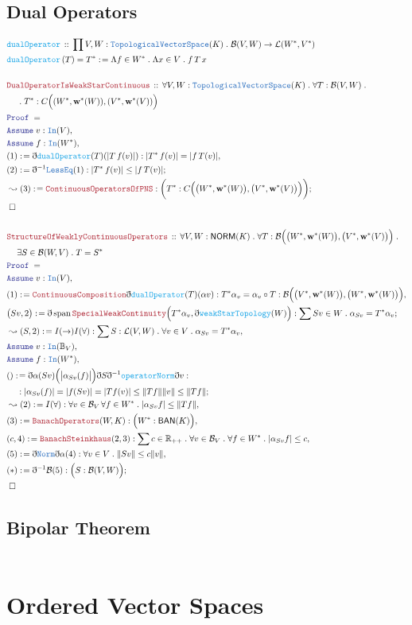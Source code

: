 \documentclass[12pt]{scrartcl}
\newcommand{\TYPE}[1]{\textcolor{NavyBlue}{\mathtt{#1}}}
\newcommand{\FUNC}[1]{\textcolor{Cerulean}{\mathtt{#1}}}
\newcommand{\LOGIC}[1]{\textcolor{Blue}{\mathtt{#1}}}
\newcommand{\THM}[1]{\textcolor{Maroon}{\mathtt{#1}}}
\renewcommand{\.}{\; . \;}
\newcommand{\de}{: \kern 0.1pc =}
\newcommand{\Act}[1]{\left( #1 \right)}
\newcommand{\Theorem}[2]{& \THM{#1} \, :: \, #2 \\ & \Proof = \\ }
\newcommand{\DeclareFunc}[2]{& \FUNC{#1} \, :: \, #2 \\}
\newcommand{\DefineNamedFunc}[4]{&  \FUNC{#1}\Act{#2} = #3 \de #4 \\}
\newcommand{\NewLine}{\\ & \kern 1pc}
\newcommand{\Page}[1]{\begin{align*} #1 \end{align*} \newpage   }
\newcommand{ \bd }{ \ByDef }
\newcommand{\Reals}{\mathbb{R} }
\newcommand{\Say}[3]{& #1 \de #2 : #3, \\}
\newcommand{\Conclude}[3]{& #1 \de #2 : #3; \\}
\newcommand{\Derive}[3]{& \leadsto #1 \de #2 : #3, \\}
\newcommand{\DeriveConclude}[3]{& \leadsto #1 \de #2 : #3 ; \\}
\newcommand{\A}{\LOGIC{Assume} \;}
\newcommand{\Assume}[2]{& \A #1 : #2, \\}
\newcommand{\QED}{\; \square}
\newcommand{\EndProof}{& \QED \\}
\newcommand{\ByDef}{\eth}
\newcommand{\Proof}{\LOGIC{Proof} \; }
\DeclareMathOperator{\Span}{span}
\newcommand{\TVS}{\TYPE{TopologicalVectorSpace}}
\newcommand{\NORM}{\textsf{NORM}}
\newcommand{\BAN}{\textsf{BAN}}
\newcommand{\w}{\mathbf{w}}
\newcommand{\B}{\mathcal{B}}
\begin{document}
\subsection{ Dual Operators }
\Page{
 \DeclareFunc{dualOperator}{ \prod V,W : \TVS(K) \. \B(V,W) \to \mathcal{L}(W^*,V^*)}
 \DefineNamedFunc{dualOperator}{  T }{ T^* }{\Lambda f \in W^* \. \Lambda x \in V \. f \, T \, x}
 \\
 \Theorem{DualOperatorIsWeakStarContinuous}{ \forall V,W : \TVS(K) \. \forall T : \B(V,W) \.  
 \NewLine \.
 T^* : C\Big( (W^*,\w^*(W)),(V^*,\w^*(V)) \Big)}
 \Assume{v}{\TYPE{In}(V)}
 \Assume{f}{\TYPE{In}(W^*)}
 \Say{(1)}{\bd \FUNC{dualOperator}(T)( | T\, f(v) |)}{ | T^* \, f(v) | = | f \, T(v) |  }
 \Conclude{(2)}{\bd^{-1} \TYPE{LessEq} (1)}{ | T^* \,f(v) | \le | f \, T(v) | }
 \DeriveConclude{(3)}{ \THM{ContinuousOperatorsOfPNS}}{ \bigg( T^* : C\Big( \big(W^*,\w^*(W)\big),\big(V^*,\w^*(V)\big)  \Big) \bigg)}
 \EndProof
 \\
 \Theorem{StructureOfWeaklyContinuousOperators}{\forall V,W : \NORM(K) \. \forall T : \B\Big( \big(W^*,\w^*(W)\big),\big( V^*,\w^*(V) \big) \Big)
  \.  \NewLine \exists  S \in \B(W,V) \. T = S^* }
  \Assume{v}{ \TYPE{In}(V)}
  \Say{(1)}{\THM{ContinuousComposition} \bd \FUNC{dualOperator}(T)(\alpha v) }{  T^* \alpha_v = \alpha_v \circ T : \B\Big( \big(V^*,\w^*(W)\big), \big(W^*,\w^*(W)\big)   \Big)  }
  \Conclude{\big(Sv,2\big)}{\bd \Span \THM{SpecialWeakContinuity}\Big( T^* \alpha_v, \bd \FUNC{weakStarTopology}(W) \Big) }{ \sum Sv \in W \. \alpha_{Sv} = T^* \alpha_v }
  \Derive{(S,2)}{I(\to)I(\forall)}{ \sum S : \mathcal{L}(V,W) \. \forall v \in V \. \alpha_{Sv} = T^* \alpha_v }
  \Assume{v}{\TYPE{In}(\mathbb{B}_V)}
  \Assume{f}{\TYPE{In}(W^*)}
  \Conclude{()}{ \bd \alpha(Sv)\Big(\big| \alpha_{Sv}(f) \big|\Big)\bd S \bd^{-1} \FUNC{operatorNorm} \bd v }{ \NewLine :
  |\alpha_{Sv}(f)  | = | f(Sv ) | = | Tf(v)  | \le \|T f \|\|v\| \le  \| T f \|}
  \Derive{(2)}{I(\forall)}{ \forall v \in \B_V \, \forall f \in W^* \. |\alpha_{Sv} f | \le \| T f \|}
  \Say{(3)}{\THM{BanachOperators}(W,K)}{\Big( W^* : \BAN (K) \Big)}
  \Say{(c,4)}{\THM{BanachSteinkhaus}(2,3)}{\sum c \in \Reals_{++} \. \forall v \in \B_V \. \forall f \in W^* \.  |\alpha_{Sv} f| \le c}
  \Say{(5)}{\bd \TYPE{Norm} \bd \alpha(4)}{ \forall v \in V \. \| Sv \| \le c \| v \| }
  \Conclude{(*)}{\bd^{-1} \B (5)}{ \Big(  S : \B(V,W) \Big) }
  \EndProof
}
\subsection{Bipolar Theorem}
\Page{}
\section{Ordered Vector Spaces}
\Page{}
\end{document}
